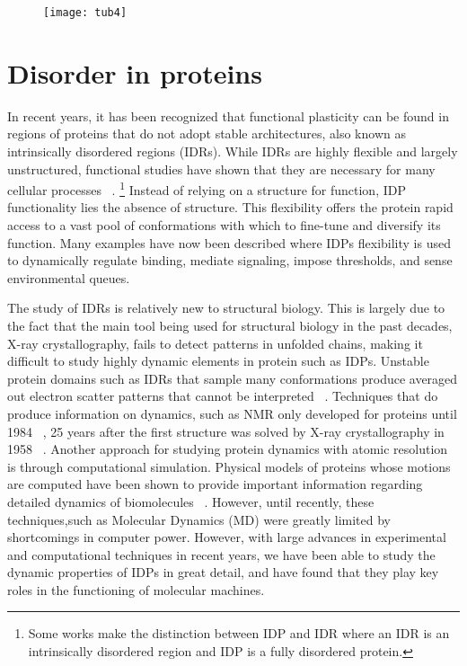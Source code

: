 \begin{figure}[h!]
\centering
\texttt{[image: tub4]}
\label{fig:tub4}
\end{figure}

\section{Disorder in proteins}

In recent years, it has been recognized that functional plasticity  can be found in regions of proteins that  do not adopt stable architectures, also known as intrinsically disordered regions (IDRs). While IDRs are highly flexible and largely unstructured, functional studies have shown that they are necessary for many cellular processes ~\cite{wright2015intrinsically}.  \footnote{Some works make the distinction between IDP and IDR where an IDR is an intrinsically disordered region and IDP is a fully disordered protein.} Instead of relying on a structure for function, IDP functionality lies the absence of structure. This flexibility offers the protein rapid access to a vast pool of conformations with which to fine-tune and diversify its function. Many examples have now been described where IDPs flexibility is used to dynamically regulate binding, mediate signaling, impose thresholds, and sense environmental queues. 

The study of IDRs is relatively new to structural biology. This is largely due to the fact that the main tool being used for structural biology in the past decades, X-ray crystallography, fails to detect patterns in unfolded chains, making it difficult to study highly dynamic elements in protein such as IDPs. Unstable protein domains such as IDRs that sample many conformations produce averaged out electron scatter patterns that cannot be interpreted ~\cite{putnam2007x}. Techniques that  do produce information  on dynamics,  such as NMR only developed for proteins  until 1984 ~\cite{wuthrich2001way}, 25 years after the first structure was solved by X-ray crystallography  in 1958 ~\cite{kendrew1958three}.  Another approach for studying protein dynamics with atomic resolution is through computational simulation.  Physical models of proteins whose motions are computed \silico have been shown to provide important information regarding detailed dynamics of biomolecules ~\cite{karplus2002molecular}. However, until recently, these techniques,such as Molecular Dynamics (MD) were greatly limited by shortcomings in computer power. However, with large advances  in experimental  and computational techniques  in recent years, we have been able to study the dynamic properties  of IDPs in great detail, and have found that  they play key roles in the functioning of molecular machines.

